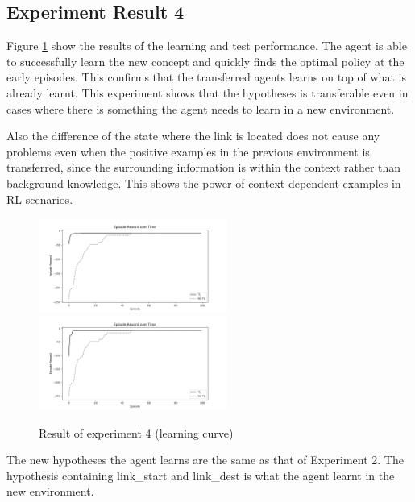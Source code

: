 \subsection{Experiment Result 4}
\label{subsec:experiment_result_4}

Figure \ref{experiment4_training_test} show the results of the learning and test performance. 
The agent is able to successfully learn the new concept and quickly finds the optimal policy at the early episodes.
This confirms that the transferred agents learns on top of what is already learnt. This experiment shows that the hypotheses is transferable even in cases where there is something the agent needs to learn in a new environment.

Also the difference of the state where the link is located does not cause any problems even when the positive examples in the previous environment is transferred, since the surrounding information is within the context rather than background knowledge. 
This shows the power of context dependent examples in RL scenarios.

\begin{figure}[!htb]
\centerline{
\includegraphics[width=0.55\textwidth]{./figures/experiment4_training}
\includegraphics[width=0.55\textwidth]{./figures/experiment4_test}
}
\caption{Result of experiment 4 (learning curve)}
\label{experiment4_training_test}
\end{figure}

The new hypotheses the agent learns are the same as that of Experiment 2. The hypothesis containing \textsf{link\_start} and \textsf{link\_dest} is what the agent learnt in the new environment.



